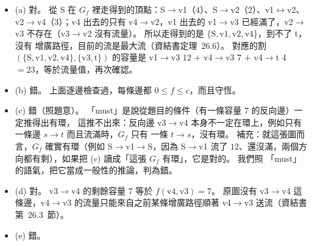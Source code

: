 \begin{pastsoln}
\begin{itemize}
\item (a) 對。 從 S 在 $G_f$ 裡走得到的頂點：S$\to$v1（$4$）、S$\to$v2（$2$）、v1$\leftrightarrow$v2、
v2$\to$v4（$3$）；v4 出去的只有 v4$\to$v2，v1 出去的 v1$\to$v3 已經滿了，v2$\to$v3 不存在（v3$\to$v2
沒有流量）。 所以走得到的是 $\{\mathrm{S}, \mathrm{v1}, \mathrm{v2}, \mathrm{v4}\}$，到不了 t，沒有
增廣路徑，目前的流是最大流（資結書定理~26.6）。 對應的割 $(\{\mathrm{S}, \mathrm{v1}, \mathrm{v2},
\mathrm{v4}\}, \{\mathrm{v3}, \mathrm{t}\})$ 的容量是 v1$\to$v3 $12$ $+$ v4$\to$v3 $7$ $+$ v4$\to$t $4$
$= 23$，等於流量值，再次確認。
\item (b) 錯。 上面逐邊檢查過，每條邊都 $0 \le f \le c$，而且守恆。
\item (c) 錯（照題意）。 「must」是說從題目的條件（有一條容量 $7$ 的反向邊）一定推得出有環，
這推不出來：反向邊 v3$\to$v4 本身不一定在環上，例如只有一條邊 $s \to t$ 而且流滿時，$G_f$ 只有
一條 $t \to s$，沒有環。 補充：就這張圖而言，$G_f$ 確實有環（例如 S$\to$v1$\to$S，因為 S$\to$v1
流了 $12$、還沒滿，兩個方向都有剩），如果把 (c) 讀成「這張 $G_f$ 有環」，它是對的。 我們照
「must」的語氣，把它當成一般性的推論，判為錯。
\item (d) 對。 v3$\to$v4 的剩餘容量 $7$ 等於 $f(\mathrm{v4}, \mathrm{v3}) = 7$。 原圖沒有 v3$\to$v4
這條邊，v4$\to$v3 的流量只能來自之前某條增廣路徑順著 v4$\to$v3 送流（資結書第~26.3~節）。
\item (e) 錯。
\end{itemize}
\end{pastsoln}
